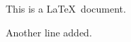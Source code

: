\documentclass{article}
\begin{document}
This is a \LaTeX\ document.

Another line added.
\end{document}
